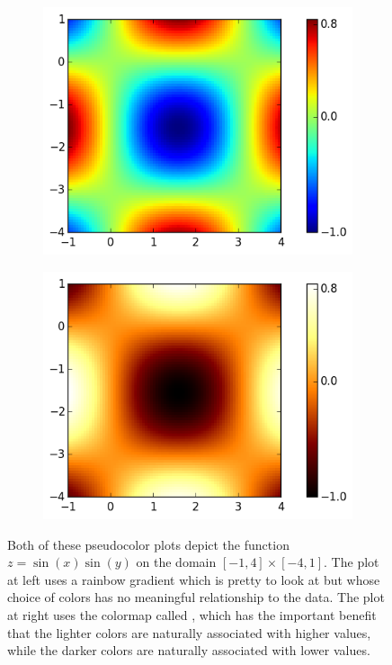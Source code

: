\begin{figure}
\centering
\begin{subfigure}{.5\textwidth}
  \centering
  \includegraphics[width=\textwidth]{heatmap_color.png}
\end{subfigure}%
\begin{subfigure}{.5\textwidth}
  \centering
  \includegraphics[width=\textwidth]{heatmap_hot.png}
\end{subfigure}
\caption{Both of these pseudocolor plots depict the function $z = \sin(x)\sin(y)$ on the domain $[-1,4] \times [-4,1]$. 
The plot at left uses a rainbow gradient which is pretty to look at but whose choice of colors has no meaningful relationship to the data. 
The plot at right uses the colormap called , which has the important benefit that the lighter colors are naturally associated with higher values, while the darker colors are naturally associated with lower values.}
\label{fig:heatmap}
\end{figure}



